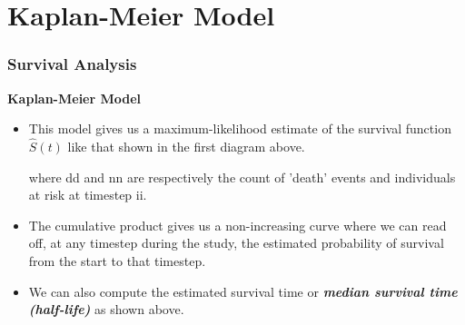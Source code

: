 	\section{Kaplan-Meier Model}
	\begin{frame}
		\frametitle{Survival Analysis}
		\noindent \textbf{Kaplan-Meier Model}
		
		\begin{itemize}
			\item This model gives us a maximum-likelihood estimate of the survival function $\hat{S}(t)$ like that shown in the first diagram above.
			
			
			where dd and nn are respectively the count of 'death' events and individuals at risk at timestep ii.
			
			\item The cumulative product gives us a non-increasing curve where we can read off, at any timestep during the study, the estimated probability of survival from the start to that timestep. 
			\item We can also compute the estimated survival time or \textbf{\textit{median survival time (half-life)}} as shown above.
		\end{itemize}
		
	\end{frame}
	